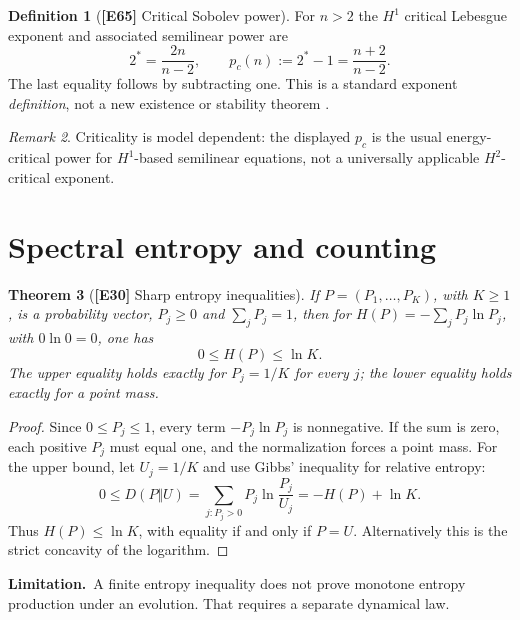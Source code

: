 \documentclass[11pt,letterpaper]{article}
\newtheorem{theorem}{Theorem}[section]
\theoremstyle{definition}
\newtheorem{definition}[theorem]{Definition}
\theoremstyle{remark}
\newtheorem{remark}[theorem]{Remark}
\newcommand{\id}[1]{\textnormal{\textbf{[#1]}}}
\newcommand{\scope}{\par\smallskip\noindent\textbf{Limitation.}\ }
\begin{document}
\begin{definition}[\id{E65} Critical Sobolev power]\label{def:critical}
For $n>2$ the $H^1$ critical Lebesgue exponent and associated semilinear
power are
\begin{equation}\label{eq:crit}
2^*=\frac{2n}{n-2},\qquad
p_c(n):=2^*-1=\frac{n+2}{n-2}.
\end{equation}
The last equality follows by subtracting one. This is a standard exponent
\emph{definition}, not a new existence or stability theorem
\cite{adamsfournier,evans}.
\end{definition}
\begin{remark}
Criticality is model dependent: the displayed $p_c$ is the usual
energy-critical power for $H^1$-based semilinear equations, not a
universally applicable $H^2$-critical exponent.
\end{remark}

\section{Spectral entropy and counting}
\begin{theorem}[\id{E30} Sharp entropy inequalities]\label{thm:entropy}
If $P=(P_1,\ldots,P_K)$, with $K\ge1$, is a probability vector,
$P_j\ge0$ and $\sum_jP_j=1$, then for
$H(P)=-\sum_jP_j\ln P_j$, with $0\ln0=0$, one has
\begin{equation}\label{eq:entropy}
0\le H(P)\le\ln K.
\end{equation}
The upper equality holds exactly for $P_j=1/K$ for every $j$; the lower
equality holds exactly for a point mass.
\end{theorem}
\begin{proof}
Since $0\le P_j\le1$, every term $-P_j\ln P_j$ is nonnegative.
If the sum is zero, each positive $P_j$ must equal one, and the
normalization forces a point mass. For the upper bound, let
$U_j=1/K$ and use Gibbs' inequality for relative entropy:
\begin{equation*}
0\le D(P\Vert U)=\sum_{j:P_j>0}P_j\ln\frac{P_j}{U_j}
=-H(P)+\ln K.
\end{equation*}
Thus $H(P)\le\ln K$, with equality if and only if $P=U$.
Alternatively this is the strict concavity of the logarithm.
\end{proof}
\scope A finite entropy inequality does not prove monotone entropy
production under an evolution. That requires a separate dynamical law.
\end{document}
